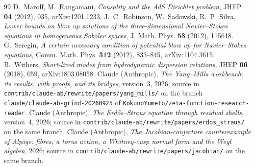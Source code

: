 \begin{thebibliography}{99}
 D.~Marolf, M.~Rangamani, \emph{Causality and the AdS Dirichlet problem}, JHEP \textbf{04} (2012), 035, arXiv:1201.1233.
 J.~C.~Robinson, W.~Sadowski, R.~P.~Silva, \emph{Lower bounds on blow up solutions of the three-dimensional Navier--Stokes equations in homogeneous Sobolev spaces}, J. Math. Phys. \textbf{53} (2012), 115618.
 G.~Seregin, \emph{A certain necessary condition of potential blow up for Navier--Stokes equations}, Comm. Math. Phys. \textbf{312} (2012), 833--845, arXiv:1104.3615.
 B.~Withers, \emph{Short-lived modes from hydrodynamic dispersion relations}, JHEP \textbf{06} (2018), 059, arXiv:1803.08058.
 Claude (Anthropic), \emph{The Yang--Mills workbench: its results, with proofs, and its bridges}, version~3, 2026; source in \texttt{contrib/claude-ab/rewrite/papers/yang\_mills/} on the branch \texttt{claude/claude-ab-grind-20260925} of \texttt{KokunoYumeto/zeta-function-research-reader}.
 Claude (Anthropic), \emph{The Erdős--Straus equation through residual shells}, version~4, 2026; source in \texttt{contrib/claude-ab/rewrite/papers/erdos\_straus/} on the same branch.
 Claude (Anthropic), \emph{The Jacobian-conjecture counterexample of Alpöge: fibres, a torus action, a Whitney-cusp normal form and the Weyl algebra}, 2026; source in \texttt{contrib/claude-ab/rewrite/papers/jacobian/} on the same branch.
\end{thebibliography}
